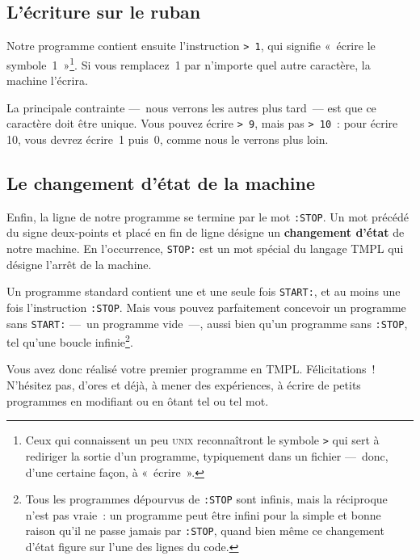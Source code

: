 \documentclass[a4paper, 11pt]{report}
\begin{document}
\par

\subsection{L'écriture sur le ruban}

Notre programme contient ensuite l'instruction \verb+> 1+, qui signifie
«~écrire le symbole~1~»\footnote{Ceux qui connaissent un peu
  \textsc{unix} reconnaîtront le symbole \texttt{>} qui sert à rediriger
  la sortie d'un programme, typiquement dans un fichier ---~donc, d'une
  certaine façon, à «~écrire~».}.  Si vous remplacez~1 par n'importe
quel autre caractère, la machine l'écrira. 

\par

La principale contrainte ---~nous verrons les autres plus tard~--- est
que ce caractère doit être unique. Vous pouvez écrire \verb+> 9+, mais
pas \verb+> 10+~: pour écrire 10, vous devrez écrire~1 puis~0, comme
nous le verrons plus loin.

\par



\subsection{Le changement d'état de la machine}

Enfin, la ligne de notre programme se termine par le mot
\texttt{:STOP}. Un mot précédé du signe deux-points et placé en fin de
ligne désigne un \textbf{changement d'état} de notre machine. En
l'occurrence, \texttt{STOP:} est un mot spécial du langage TMPL qui
désigne l'arrêt de la machine.

\par

Un programme standard contient une et une seule fois \texttt{START:}, et
au moins une fois l'instruction \texttt{:STOP}. Mais vous pouvez
parfaitement concevoir un programme sans \texttt{START:} ---~un
programme vide~---, aussi bien qu'un programme sans \texttt{:STOP}, tel
qu'une boucle infinie\footnote{Tous les programmes dépourvus de
  \texttt{:STOP} sont infinis, mais la réciproque n'est pas vraie~: un
  programme peut être infini pour la simple et bonne raison qu'il ne
  passe jamais par \texttt{:STOP}, quand bien même ce changement d'état
  figure sur l'une des lignes du code.}. 
\par

Vous avez donc réalisé votre premier programme en TMPL. Félicitations~!
N'hésitez pas, d'ores et déjà, à mener des expériences, à écrire de
petits programmes en modifiant ou en ôtant tel ou tel mot.
\end{document}
